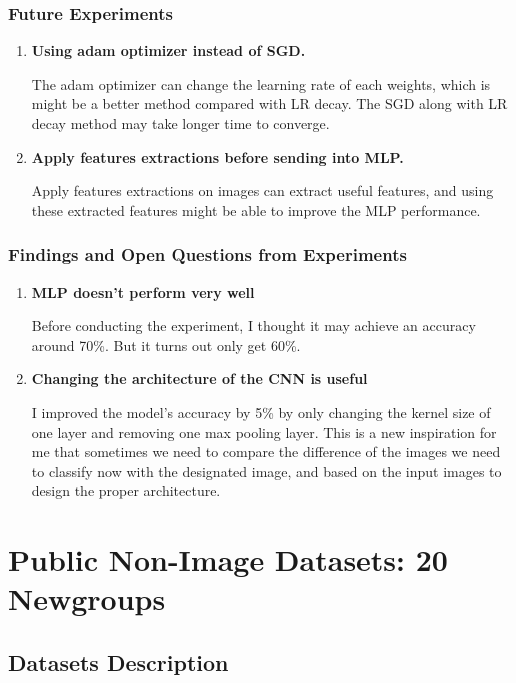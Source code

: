 \documentclass[twocolumn]{extarticle}
\begin{document}
\subsubsection{Future Experiments}

\begin{enumerate}
\item \textbf{Using adam optimizer instead of SGD.}

The adam optimizer can change the learning rate of each weights, which is might be a better method compared with LR decay. The SGD along with LR decay method may take longer time to converge.
\item \textbf{Apply features extractions before sending into MLP.}

Apply features extractions on images can extract useful features, and using these extracted features might be able to improve the MLP performance.
\end{enumerate}

\subsubsection{Findings and Open Questions from Experiments}

\begin{enumerate}
\item \textbf{MLP doesn't perform very well}

Before conducting the experiment, I thought it may achieve an accuracy around 70\%. But it turns out only get 60\%.

\item \textbf{Changing the architecture of the CNN is useful}

I improved the model's accuracy by 5\% by only changing the kernel size of one layer and removing one max pooling layer. This is a new inspiration for me that sometimes we need to compare the difference of the images we need to classify now with the designated image, and based on the input images to design the proper architecture. 
\end{enumerate}

\section{Public Non-Image Datasets: 20 Newgroups}
\subsection{Datasets Description}
\end{document}
